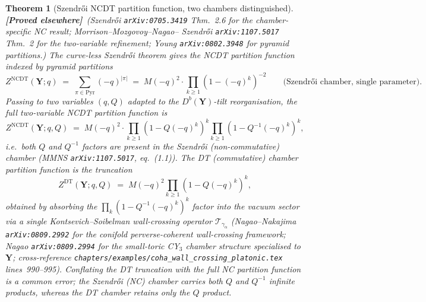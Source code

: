 \documentclass[11pt]{amsart}
\newtheorem{theorem}{Theorem}[section]
\theoremstyle{definition}
\providecommand{\bY}{\mathbf{Y}}
\providecommand{\ClaimStatusProvedElsewhere}{\textbf{\textsf{[Proved elsewhere]}}}
\begin{document}
\begin{theorem}[Szendrői NCDT partition function, two chambers distinguished]
\label{thm:szendroi-ncdt}
\ClaimStatusProvedElsewhere\ \emph{(Szendrői \texttt{arXiv:0705.3419}
Thm.~2.6 for the chamber-specific NC result; Morrison--Mozgovoy--Nagao--
Szendrői \texttt{arXiv:1107.5017} Thm.~2 for the two-variable refinement;
Young \texttt{arXiv:0802.3948} for pyramid partitions.)}
The curve-less Szendrői theorem gives the NCDT partition function
indexed by pyramid partitions
\[
  Z^{\mathrm{NCDT}}(\bY; q)
  \;=\; \sum_{\pi \in \mathrm{Pyr}} (-q)^{|\pi|}
  \;=\; M(-q)^2 \cdot \prod_{k\ge1}(1-(-q)^{k})^{-2}
  \qquad \text{(Szendrői chamber, single parameter).}
\]
Passing to two variables $(q,Q)$ adapted to the $D^b(\bY)$-tilt
reorganisation, the full two-variable NCDT partition function is
\[
  Z^{\mathrm{NCDT}}(\bY;q,Q)
  \;=\; M(-q)^2 \cdot
    \prod_{k\ge 1}(1 - Q (-q)^k)^{k}
    \prod_{k\ge 1}(1 - Q^{-1}(-q)^k)^{k},
\]
i.e.\ \emph{both} $Q$ and $Q^{-1}$ factors are present in the Szendrői
(non-commutative) chamber (MMNS \texttt{arXiv:1107.5017}, eq.~(1.1)).
The DT (commutative) chamber partition function is the truncation
\[
  Z^{\mathrm{DT}}(\bY; q, Q)
  \;=\; M(-q)^2 \prod_{k \geq 1}(1 - Q(-q)^k)^k,
\]
obtained by absorbing the $\prod_k (1 - Q^{-1}(-q)^k)^k$ factor into the
vacuum sector via a single Kontsevich--Soibelman wall-crossing operator
$\mathcal T_{\gamma_\alpha}$ (Nagao--Nakajima
\texttt{arXiv:0809.2992} for the conifold perverse-coherent wall-crossing
framework; Nagao \texttt{arXiv:0809.2994} for the small-toric CY$_3$
chamber structure specialised to $\bY$;
cross-reference \texttt{chapters/examples/coha\_wall\_crossing\_platonic.tex}
lines~990--995). Conflating the DT truncation with the full NC
partition function is a common error; the Szendrői (NC) chamber
carries both $Q$ and $Q^{-1}$ infinite products, whereas the DT chamber
retains only the $Q$ product.
\end{theorem}
\end{document}
